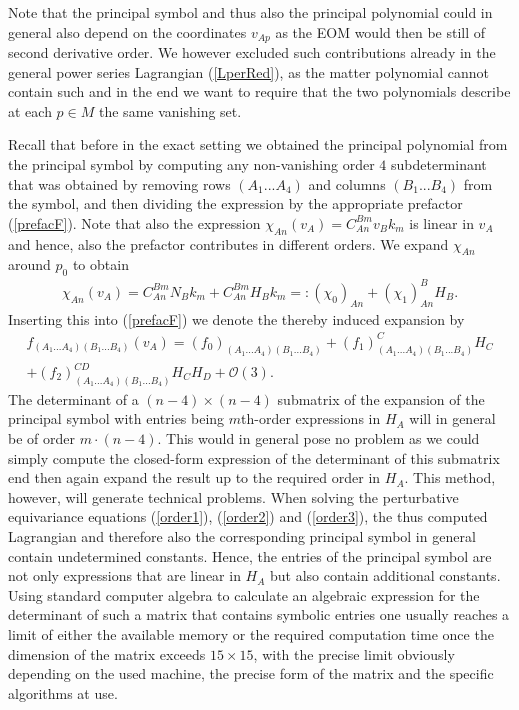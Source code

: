 %
%
%
%
%
%
%
Note that the principal symbol and thus also the principal polynomial could in general also depend on the coordinates $v_{Ap}$ as the EOM would then be still of second derivative order. We however excluded such contributions already in the general power series Lagrangian (\ref{LperRed}),  as the matter polynomial cannot contain such and in the end we want to require that the two polynomials describe at each $p \in M$ the same vanishing set. 

Recall that before in the exact setting we obtained the principal polynomial from the principal symbol by computing any non-vanishing order $4$ subdeterminant that was obtained by removing rows $(A_1...A_4)$ and columns $(B_1...B_4)$ from the symbol, and then dividing the expression by the appropriate prefactor (\ref{prefacF}).
Note that also the expression $\chi_{An}(v_A) = C_{An}^{Bm}v_Bk_m$ is linear in $v_A$ and hence, also the prefactor contributes in different orders. We expand $\chi_{An}$ around $p_0$ to obtain
\begin{align}
\chi_{An}(v_A) =  C^{Bm}_{An} N_B k_m + C^{Bm}_{An} H_B k_m =: (\chi_0)_{An} + (\chi_1)^B_{An}H_B.
\end{align}
Inserting this into (\ref{prefacF}) we denote the thereby induced expansion by
\begin{multline}\label{prefacExp}
    f_{(A_1...A_4)(B_1...B_4)}(v_A) = (f_0)_{(A_1...A_4)(B_1...B_4)} + (f_1)^C_{(A_1...A_4)(B_1...B_4)}H_C\\ + (f_2)^{CD}_{(A_1...A_4)(B_1...B_4)}H_CH_D
    + \mathcal{O}(3).
\end{multline}
The determinant of a $(n-4) \times (n-4)$ submatrix of the expansion of the principal symbol with entries being $m$th-order expressions in $H_A$ will in general be of order $m\cdot(n-4)$. This would in general pose no problem as we could simply compute the closed-form expression of the determinant of this submatrix end then again expand the result up to the required order in $H_A$. This method, however, will generate technical problems. When solving the perturbative equivariance equations (\ref{order1}), (\ref{order2}) and (\ref{order3}), the thus computed Lagrangian and therefore also the corresponding principal symbol in general contain undetermined constants. Hence, the entries of the principal symbol are not only expressions that are linear in $H_A$ but also contain additional constants. Using standard computer algebra to calculate an algebraic expression for the determinant of such a matrix that contains symbolic entries one usually reaches a limit of either the available memory or the required computation time once the dimension of the matrix exceeds $15 \times 15$, with the precise limit obviously depending on the used machine, the precise form of the matrix and the specific algorithms at use. 


